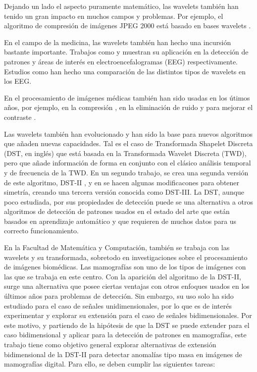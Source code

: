 Dejando un lado el aspecto puramente matemático, las wavelets también han tenido un gran impacto  
en muchos campos y problemas. Por ejemplo, el algoritmo de compresión de imágenes JPEG 2000 está basado en
bases wavelets \cite{Taubman2002}.

En el campo de la medicina, las wavelets también han hecho una incursión bastante importante. Trabajos como
\cite{Bhattacharyya2018} y \cite{Sharma2020} muestran su aplicación en la detección de patrones y áreas de interés
en electroencefalogramas (EEG) respectivamente. Estudios como \cite{Too2018} han hecho una comparación de las distintos
tipos de wavelets en los EEG. 

En el procesamiento de imágenes médicas también han sido 
usadas en los útimos años, por ejemplo, en la compresión \cite{Bruylants2015}\cite{Alkinani2021}, en la eliminación de ruido
 \cite{Wang2006}\cite{George2016}\cite{Patil2021} y para 
mejorar el contraste \cite{Dikshit2022}.

Las wavelets también han evolucionado y han sido la base para nuevos algoritmos que añaden nuevas capacidades.
Tal es el caso de Transformada Shapelet Discreta (DST, en inglés) \cite{Guido2008} que está basada en la Transformada 
Wavelet Discreta (TWD), pero que añade información de forma en conjunto con el clásico análisis temporal y de frecuencia de la
TWD. En un segundo trabajo, se crea una segunda versión de este algoritmo, DST-II \cite{Guido2018}, y en \cite{Guido2021} se hacen 
algunas modificacones para obtener simetría, creando una tercera versión conocida como DST-III.
La DST, aunque poco estudiada, por sus propiedades de detección puede se una alternativa a otros algoritmos de
detección de patrones usados en el estado del arte que están basados en aprendizaje automático y que requieren
de muchos datos para us correcto funcionamiento.

En la Facultad de Matemática y Computación, también se trabaja con las wavelets y su transformada, sobretodo en
investigaciones sobre el procesamiento de imágenes biomédicas. Las mamografías son uno de los tipos de imágenes
con las que se trabaja en este centro. 
Con la aparición del algoritmo de la DST-II, surge  
una alternativa que posee ciertas ventajas con otros enfoques  
usados en los últimos años para problemas de detección. Sin embargo, su uso solo ha sido estudiado para el 
caso de señales unidimensionales, por lo que es de interés experimentar y explorar su extensión
para el caso de señales bidimensionales. Por este motivo, y partiendo de la hipótesis de que la DST se 
puede extender para el caso bidimensional y aplicar para la detección de patrones en mamografías, este trabajo tiene como 
objetivo general explorar alternativas de extensión bidimensional de la DST-II para detectar 
anomalías tipo masa en imágenes de mamografías digital. Para ello, se deben cumplir las 
siguientes tareas:

